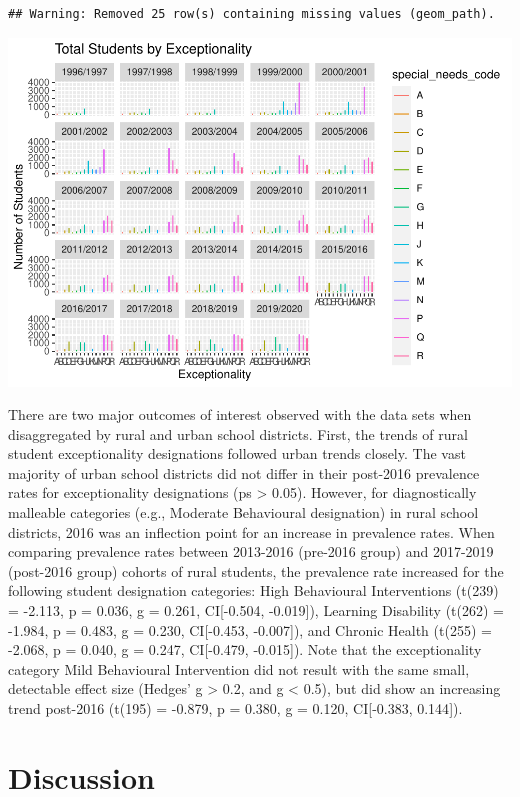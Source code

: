 \documentclass[
  english,
  man]{apa6}
\begin{document}
\begin{verbatim}
## Warning: Removed 25 row(s) containing missing values (geom_path).
\end{verbatim}

\includegraphics{Final_project_files/figure-latex/urban play-2.pdf}

There are two major outcomes of interest observed with the data sets when disaggregated by rural and urban school districts. First, the trends of rural student exceptionality designations followed urban trends closely. The vast majority of urban school districts did not differ in their post-2016 prevalence rates for exceptionality designations (ps \textgreater{} 0.05). However, for diagnostically malleable categories (e.g., Moderate Behavioural designation) in rural school districts, 2016 was an inflection point for an increase in prevalence rates. When comparing prevalence rates between 2013-2016 (pre-2016 group) and 2017-2019 (post-2016 group) cohorts of rural students, the prevalence rate increased for the following student designation categories: High Behavioural Interventions (t(239) = -2.113, p = 0.036, g = 0.261, CI{[}-0.504, -0.019{]}), Learning Disability (t(262) = -1.984, p = 0.483, g = 0.230, CI{[}-0.453, -0.007{]}), and Chronic Health (t(255) = -2.068, p = 0.040, g = 0.247, CI{[}-0.479, -0.015{]}). Note that the exceptionality category Mild Behavioural Intervention did not result with the same small, detectable effect size (Hedges' g \textgreater{} 0.2, and g \textless{} 0.5), but did show an increasing trend post-2016 (t(195) = -0.879, p = 0.380, g = 0.120, CI{[}-0.383, 0.144{]}).

\hypertarget{discussion}{%
\section{Discussion}\label{discussion}}
\end{document}
